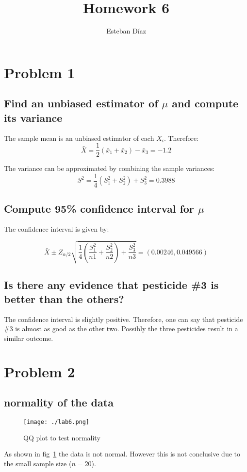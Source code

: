 \documentclass[10pt]{article}
\author{Esteban D\'{i}az}
\title{Homework 6}{}
\begin{document}
\maketitle

\section{Problem 1}

\subsection{Find an unbiased estimator of $\mu$ and compute its variance}
The sample mean is an unbiased estimator of each $X_i$. Therefore:
\[
  \bar{X} =  \frac{1}{2} (\bar{x}_1 +\bar{x}_2) -\bar{x}_3 = -1.2
\]

The variance can be approximated by combining the sample variances:
\[
  S^2 = \frac{1}{4} \left(S_1^2 +S_2^2\right) +S_3^2 =0.3988 
\]


\subsection{Compute 95\% confidence interval for $\mu$}
The confidence interval is given by:

\[
   \bar{X} \pm Z_{\alpha/2}\sqrt{\frac{1}{4} \left(\frac{S_1^2}{n1} +\frac{S_2^2}{n2}\right) +\frac{S_3^2}{n3}} = (0.00246, 0.049566)
\]

\subsection{Is there any evidence that pesticide \#3 is better than the others?}
The confidence interval is slightly positive. Therefore, one can say that pesticide
\#3 is almost as good as the other two. Possibly the three pesticides result in a 
similar outcome.



\section{Problem 2}

\subsection{normality of the data}

\begin{figure}[H]
    \centering
    \texttt{[image: ./lab6.png]}
    \caption{QQ plot to test normality}
    \label{fig:fig1}
\end{figure}
As shown in fig~\ref{fig:fig1} the data is not normal. However this is not conclusive due to 
the small sample size ($n=20$).
\end{document}
